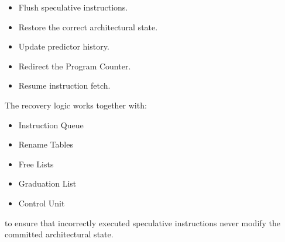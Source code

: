 \begin{itemize}
  \item Flush speculative instructions.
  \item Restore the correct architectural state.
  \item Update predictor history.
  \item Redirect the Program Counter.
  \item Resume instruction fetch.
\end{itemize}

The recovery logic works together with:
\begin{itemize}
  \item Instruction Queue
  \item Rename Tables
  \item Free Lists
  \item Graduation List
  \item Control Unit
\end{itemize}

to ensure that incorrectly executed speculative instructions never modify the committed
architectural state.

\begin{rtlrefs}
\end{rtlrefs}
